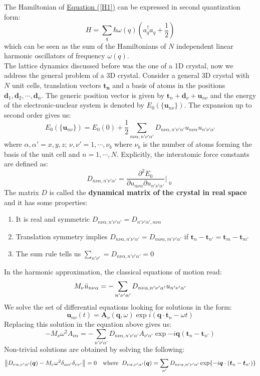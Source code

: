 \documentclass[10.75pt,a4paper,openright,bottom=2cm]{article}
\renewcommand{\Vec}[1]{\boldsymbol{#1}}
\begin{document}
The Hamiltonian of \hyperref[H1]{Equation (\ref{H1})} can be expressed in second quantization form:
\[
H=\sum_q\hbar\omega(q)\left(a_q^\dagger a_q+\frac{1}{2}\right)
\]
which can be seen as the sum of the Hamiltonians of $N$ independent linear harmonic oscillators of frequency $\omega(q)$.\\
The lattice dynamics discussed before was the one of a 1D crystal, now we address the general problem of a 3D crystal. Consider a general 3D crystal with $N$ unit cells, translation vectors $\Vec{t_n}$ and a basis of atoms in the positions $\Vec{d}_1,\Vec{d}_2,\cdots,\Vec{d}_n$. The generic position vector is given by $\Vec{t}_n+\Vec{d}_\nu+\Vec{u}_{n\nu}$ and the energy of the electronic-nuclear system is denoted by $E_0(\{\Vec{u}_{n\nu}\})$. The expansion up to second order gives us:
\[
E_0(\{\Vec{u}_{n\nu}\})=E_0(0)+\frac{1}{2}\sum_{n\nu\alpha,n'\nu'\alpha'}D_{n\nu\alpha,n'\nu'\alpha'}u_{n\nu\alpha}u_{n'\nu'\alpha'}
\]
where $\alpha,\alpha'=x,y,z$; $\nu,\nu'=1,\cdots,\nu_b$ where $\nu_b$ is the number of atoms forming the basis of the unit cell and $n=1,\cdots,N$. Explicitly, the interatomic force constants are defined as:
\[
D_{n\nu\alpha,n'\nu'\alpha'}=\frac{\partial^2E_0}{\partial u_{n\nu\alpha}\partial u_{n'\nu'\alpha'}}\Bigr|_{\substack{0}}
\]
The matrix $D$ is called the \textbf{dynamical matrix of the crystal in real space} and it has some properties:
\begin{enumerate}
    \item It is real and symmetric $D_{n\nu\alpha,n'\nu'\alpha'}=D_{n'\nu'\alpha',n\nu\alpha}$
    \item Translation symmetry implies $D_{n\nu\alpha,n'\nu'\alpha'}=D_{m\nu\alpha,m'\nu'\alpha'}$ if $\Vec{t}_n-\Vec{t}_{n'}=\Vec{t}_m-\Vec{t}_{m'}$
    \item The sum rule tells us $\sum_{n'\nu'}=D_{n\nu\alpha,n'\nu'\alpha'}=0$
\end{enumerate}
In the harmonic approximation, the classical equations of motion read:
\[
M_\nu\Ddot{u}_{n\nu\alpha}=-\sum_{n'\nu'\alpha'}D_{n\nu\alpha,n'\nu'\alpha'}u_{n'\nu'\alpha'}
\]
We solve the set of differential equations looking for solutions in the form:
\[
\Vec{u}_{n\nu}(t)=\Vec{A}_\nu(\Vec{q},\omega)\exp{i(\Vec{q}\cdot\Vec{t}_n-\omega t)}
\]
Replacing this solution in the equation above gives us:
\[
-M_\nu\omega^2A_{\nu\alpha}=-\sum_{n'\nu'\alpha'}D_{n\nu\alpha,n'\nu'\alpha'}A_{\nu'\alpha'}\exp{-i\Vec{q}(\Vec{t}_n-\Vec{t}_{n'})}
\]
Non-trivial solutions are obtained by solving the following:
\[
\norm{D_{\nu\alpha,\nu'\alpha'}(\Vec{q})-M_\nu\omega^2\delta_{\alpha\alpha'}\delta_{\nu\nu'}}=0 \quad \text{where}\;\; D_{\nu\alpha,\nu'\alpha'}(\Vec{q})=\sum_{n'}D_{n\nu\alpha,n'\nu'\alpha'}\exp{-i\Vec{q}\cdot(\Vec{t}_n-\Vec{t}_{n'})}
\]
\end{document}
